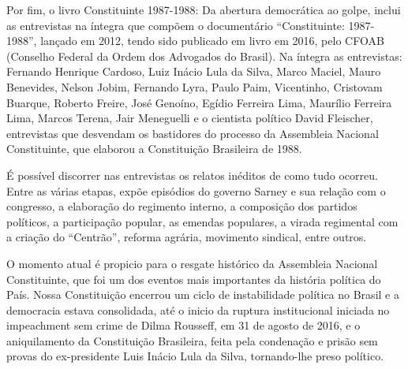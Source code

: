 Por fim, o livro Constituinte 1987-1988: Da abertura democrática ao golpe, inclui as entrevistas na íntegra que compõem o documentário “Constituinte: 1987-1988”, lançado em 2012, tendo sido publicado em livro em 2016, pelo CFOAB (Conselho Federal da Ordem dos Advogados do Brasil). Na íntegra as entrevistas: Fernando Henrique Cardoso, Luiz Inácio Lula da Silva, Marco Maciel, Mauro Benevides, Nelson Jobim, Fernando Lyra, Paulo Paim, Vicentinho, Cristovam Buarque, Roberto Freire, José Genoíno, Egídio Ferreira Lima, Maurílio Ferreira Lima, Marcos Terena, Jair Meneguelli e o cientista político David Fleischer, entrevistas que desvendam os bastidores do processo da Assembleia Nacional Constituinte, que elaborou a Constituição Brasileira de 1988.

É possível discorrer nas entrevistas os relatos inéditos de como tudo ocorreu. Entre as várias etapas, expõe episódios do governo Sarney e sua relação com o congresso, a elaboração do regimento interno, a composição dos partidos políticos, a participação popular, as emendas populares, a virada regimental com a criação do “Centrão”, reforma agrária, movimento sindical, entre outros.

O momento atual é propicio para o resgate histórico da Assembleia Nacional Constituinte, que foi um dos eventos mais importantes da história política do País. Nossa Constituição encerrou um ciclo de instabilidade política no Brasil e a democracia estava consolidada, até o inicio da ruptura institucional iniciada no impeachment sem crime de Dilma Rousseff, em 31 de agosto de 2016, e o aniquilamento da Constituição Brasileira, feita pela condenação e prisão sem provas do ex-presidente Luis Inácio Lula da Silva, tornando-lhe preso político.